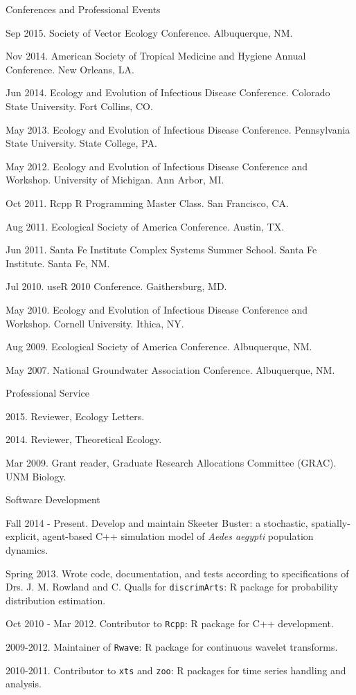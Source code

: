 \documentclass{resume} %
\begin{document}
\begin{rSection}{Conferences and Professional Events}
\item Sep 2015. Society of Vector Ecology Conference.  Albuquerque, NM.
\item Nov 2014. American Society of Tropical Medicine and Hygiene Annual
Conference.  New Orleans, LA.
\item Jun 2014. Ecology and Evolution of Infectious Disease Conference.
Colorado State University.  Fort Collins, CO.
\item May 2013. Ecology and Evolution of Infectious Disease Conference.
Pennsylvania State University.  State College, PA.
\item May 2012. Ecology and Evolution of Infectious Disease Conference
and Workshop.  University of Michigan.  Ann Arbor, MI.
\item Oct 2011. Rcpp R Programming Master Class. San Francisco, CA.
\item Aug 2011. Ecological Society of America Conference. Austin, TX.
\item Jun 2011. Santa Fe Institute Complex Systems Summer School. Santa Fe Institute. Santa Fe, NM. 
\item Jul 2010.  useR 2010 Conference. Gaithersburg, MD. 
\item May 2010. Ecology and Evolution of Infectious Disease Conference
and Workshop.  Cornell University.  Ithica, NY.
\item Aug 2009. Ecological Society of America Conference. Albuquerque, NM.
\item May 2007. National Groundwater Association Conference. Albuquerque, NM. 
\end{rSection}

\begin{rSection}{Professional Service}
\item 2015. Reviewer, Ecology Letters.
\item 2014. Reviewer, Theoretical Ecology.
\item Mar 2009. Grant reader, Graduate Research Allocations Committee (GRAC). UNM Biology.
\end{rSection}

\begin{rSection}{Software Development}
\item Fall 2014 - Present. Develop and maintain Skeeter Buster: a stochastic,
spatially-explicit, agent-based C++ simulation model of {\em Aedes aegypti}
population dynamics.
\item Spring 2013. Wrote code, documentation, and tests according to
specifications of Drs. J. M. Rowland and C. Qualls for \texttt{discrimArts}: R package for probability
distribution estimation.
\item Oct 2010 - Mar 2012. Contributor to \texttt{Rcpp}: R package for C++ development.
\item 2009-2012. Maintainer of \texttt{Rwave}: R package for continuous wavelet transforms.
\item 2010-2011. Contributor to \texttt{xts} and \texttt{zoo}: R packages for time series handling and analysis.
\end{rSection}
\end{document}
